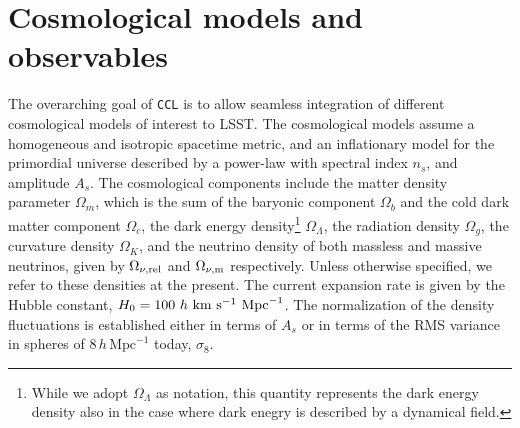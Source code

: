 \documentclass[\docopts]{\docclass}
\newcommand{\ccl}{{\tt CCL}\xspace}
\begin{document}
\section{Cosmological models and observables}
\label{sec:models}

The overarching goal of \ccl is to allow seamless integration of different cosmological models of interest to LSST. The cosmological models assume a homogeneous and isotropic spacetime metric, and an inflationary model for the primordial universe described by a power-law with spectral index $n_s$, and amplitude $A_s$. The cosmological components include the matter density parameter $\Omega_m$, which is the sum of the baryonic component $\Omega_b$ and the cold dark matter component $\Omega_c$, the dark energy density\footnote{While we adopt $\Omega_\Lambda$ as notation, this quantity represents the dark energy density also in the case where dark enegry is described by a dynamical field.} $\Omega_\Lambda$, the radiation density $\Omega_g$, the curvature density $\Omega_K$, and the neutrino density of both massless and massive neutrinos, given by $\Omega_{\nu, {\rm rel}}$ and $\Omega_{\nu, {\rm m}}$ respectively. Unless otherwise specified, we refer to these densities at the present. The current expansion rate is given by the Hubble constant, $H_0 = 100~h~{\rm km}~{\rm s}^{-1}~{\rm Mpc}^{-1}$. The normalization of the density fluctuations is established either in terms of $A_s$ or in terms of the RMS variance in spheres of $8\,h\,\text{Mpc}^{-1}$ today, $\sigma_8$. 
\end{document}
